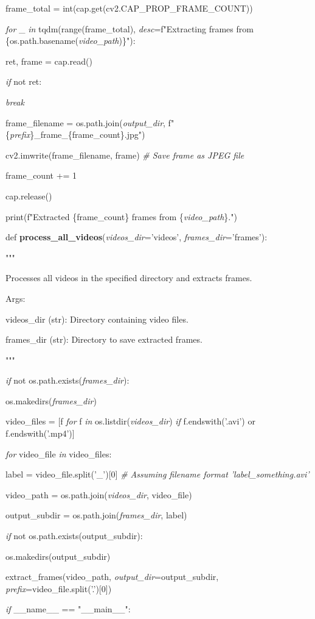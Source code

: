 \documentclass[
]{article}
\begin{document}
frame\_total = int(cap.get(cv2.CAP\_PROP\_FRAME\_COUNT))

\emph{for} \_ \emph{in} tqdm(range(frame\_total), \emph{desc}=f"Extracting frames from \{os.path.basename(\emph{video\_path})\}"):

ret, frame = cap.read()

\emph{if} not ret:

\emph{break}

frame\_filename = os.path.join(\emph{output\_dir}, f"\{\emph{prefix}\}\_frame\_\{frame\_count\}.jpg")

cv2.imwrite(frame\_filename, frame) \emph{\# Save frame as JPEG file}

frame\_count += 1

cap.release()

print(f"Extracted \{frame\_count\} frames from \{\emph{video\_path}\}.")

def \textbf{process\_all\_videos}(\emph{videos\_dir}='videos', \emph{frames\_dir}='frames'):

"""

Processes all videos in the specified directory and extracts frames.

Args:

videos\_dir (str): Directory containing video files.

frames\_dir (str): Directory to save extracted frames.

"""

\emph{if} not os.path.exists(\emph{frames\_dir}):

os.makedirs(\emph{frames\_dir})

video\_files = {[}f \emph{for} f \emph{in} os.listdir(\emph{videos\_dir}) \emph{if} f.endswith('.avi') or f.endswith('.mp4'){]}

\emph{for} video\_file \emph{in} video\_files:

label = video\_file.split('\_'){[}0{]} \emph{\# Assuming filename format 'label\_something.avi'}

video\_path = os.path.join(\emph{videos\_dir}, video\_file)

output\_subdir = os.path.join(\emph{frames\_dir}, label)

\emph{if} not os.path.exists(output\_subdir):

os.makedirs(output\_subdir)

extract\_frames(video\_path, \emph{output\_dir}=output\_subdir, \emph{prefix}=video\_file.split('.'){[}0{]})

\emph{if} \_\_name\_\_ == "\_\_main\_\_":
\end{document}
